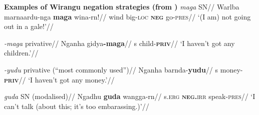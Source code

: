 \pex \textbf{Examples of Wirangu negation strategies (from \citealt{Hercus1999})}\label{wgu-exx}
\a\begingl\glpreamble \textit{maga} SN//
\gla Warlba marnaardu-nga \textbf{maga} wina-rn!//
\glb wind big\textsc{-loc} \textsc{\textbf{neg}} go\textsc{-pres}//
\glft `(I am) not going out in a gale!'//\endgl

\a\begingl\glpreamble \textit{-maga} privative//
\gla Nganha gidya\textbf{-maga}//
\gls{s} child-\textsc{\textbf{priv}}//
\glft`I haven't got any children.'//\endgl

\a\begingl
\glpreamble \textit{-yudu} privative (``most commonly used'')//
\gla Nganha barnda-\textbf{yudu}//
\gls{s} money-\textsc{\textbf{priv}}//
\glft`I haven't got any money.'//\endgl

\a\begingl\glpreamble \textit{guda} SN (modalised)//
\gla Ngadhu \textbf{guda} wangga-rn//
\gls{s}.\textsc{erg} \textsc{\textbf{neg.}irr} speak\textsc{-pres}//
\glft`I can't talk (about this; it's too embarassing.)'//\endgl
\xe


